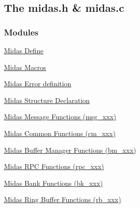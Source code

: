 \subsection{The midas.h \& midas.c}
\label{group__midasincludecode}
\subsubsection*{Modules}
\begin{DoxyCompactItemize}
\item 
\hyperlink{group__mdefineh}{Midas Define}
\item 
\hyperlink{group__mmacroh}{Midas Macros}
\item 
\hyperlink{group__mdeferrorh}{Midas Error definition}
\item 
\hyperlink{group__msectionh}{Midas Structure Declaration}
\item 
\hyperlink{group__msgfunctionc}{Midas Message Functions (msg\_\-xxx)}
\item 
\hyperlink{group__cmfunctionc}{Midas Common Functions (cm\_\-xxx)}
\item 
\hyperlink{group__bmfunctionc}{Midas Buffer Manager Functions (bm\_\-xxx)}
\item 
\hyperlink{group__rpcfunctionc}{Midas RPC Functions (rpc\_\-xxx)}
\item 
\hyperlink{group__bkfunctionc}{Midas Bank Functions (bk\_\-xxx)}
\item 
\hyperlink{group__rbfunctionc}{Midas Ring Buffer Functions (rb\_\-xxx)}
\end{DoxyCompactItemize}
